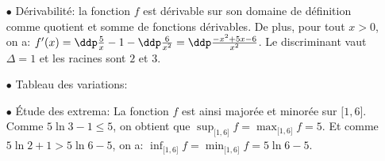 \begin{correction}
\begin{enumerate}
\begin{itemize}
\item[$\bullet$] D\'erivabilit\'e: la fonction $f$ est d\'erivable sur son domaine de d\'efinition comme quotient et somme de fonctions d\'erivables. De plus, pour tout $x>0$, on a: $f^{\prime}(x)=\ddp\frac{5}{x}-1-\ddp\frac{6}{x^2}=\ddp\frac{-x^2+5x-6}{x^2}$. Le discriminant vaut $\Delta=1$ et les racines sont $2$ et $3$.  
\item[$\bullet$] Tableau des variations:
\begin{center}
\end{center}
\item[$\bullet$] \'Etude des extrema: La fonction $f$ est ainsi major\'ee et minor\'ee sur $\lbrack 1,6\rbrack$. Comme $5\ln{3}-1\leq 5$, on obtient que $\sup_{\lbrack 1,6\rbrack } f=\max_{\lbrack 1,6\rbrack} f=5$. Et comme $5\ln{2}+1>5\ln{6}-5$, on a: $\inf_{\lbrack 1,6\rbrack } f=\min_{\lbrack 1,6\rbrack} f=5\ln{6}-5$.
\end{itemize}
\end{enumerate}
\end{correction}


\vspace*{0.5cm}



